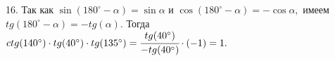 16. Так как $\sin (180^\circ-\alpha)=\sin \alpha$ и $\cos (180^\circ-\alpha)=- \cos \alpha,$ имеем $tg(180^\circ-\alpha)=-tg(\alpha).$ Тогда $ctg(140^\circ)\cdot tg(40^\circ)\cdot tg(135^\circ)=\cfrac{tg(40^\circ)}{-tg(40^\circ)}\cdot(-1)=1.$\\
